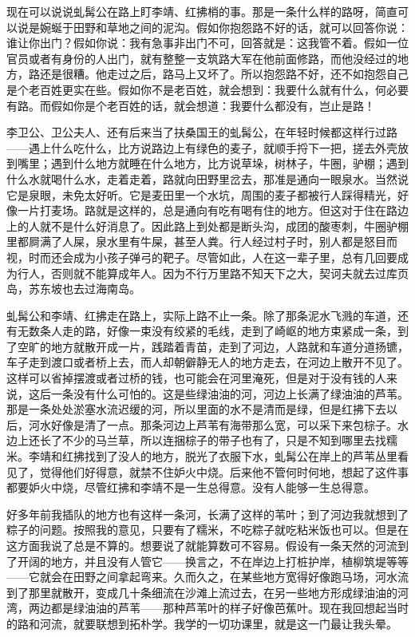 现在可以说说虬髯公在路上盯李靖、红拂梢的事。那是一条什么样的路呀，简直可以说是婉蜒于田野和草地之间的泥沟。假如你抱怨路不好的话，就可以回答你说：谁让你出门？假如你说：我有急事非出门不可，回答就是：这我管不着。假如一位官员或者有身份的人出门，就有整整一支筑路大军在他前面修路，而他没经过的地方，路还是很糟。他走过之后，路马上又坏了。所以抱怨路不好，还不如抱怨自己是个老百姓更实在些。假如你不是老百姓，就会想到：我要什么就有什么，何必要有路。而假如你是个老百姓的话，就会想道：我要什么都没有，岂止是路！ 

李卫公、卫公夫人、还有后来当了扶桑国王的虬髯公，在年轻时候都这样行过路——遇上什么吃什么，比方说路边上有绿色的麦子，就顺手捋下一把，搓去外壳放到嘴里；遇到什么地方就睡在什么地方，比方说草垛，树林子，牛圈，驴棚；遇到什么水就喝什么水，走着走着，路就向田野里岔去，那准是通向一眼泉水。当然说它是泉眼，未免太好听。它是麦田里一个水坑，周围的麦子都被行人踩得精光，好像一片打麦场。路就是这样的，总是通向有吃有喝有住的地方。但这对于住在路边上的人就不是什么好消息了。因此路上到处都是断头沟，成团的酸枣刺，牛圈驴棚里都屙满了人屎，泉水里有牛屎，甚至人粪。行人经过村子时，别人都是怒目而视，时而还会成为小孩子弹弓的靶子。尽管如此，人在这一辈子里，总有几回要成为行人，否则就不能算成年人。因为不行万里路不知天下之大，契诃夫就去过库页岛，苏东坡也去过海南岛。 

虬髯公和李靖、红拂走在路上，实际上路不止一条。除了那条泥水飞溅的车道，还有无数条人走的路，好像一束没有绞紧的毛线，走到了崎岖的地方束紧成一条，到了空旷的地方就散开成一片，践踏着青苗，走到了河边，人路就和车道分道扬镳，车子走到渡口或者桥上去，而人却朝僻静无人的地方走去，在河边上散开不见了。这样可以省掉摆渡或者过桥的钱，也可能会在河里淹死，但是对于没有钱的人来说，这后一条没有什么可怕的。这是些绿油油的河，河边上长满了绿油油的芦苇。那是一条处处淤塞水流迟缓的河，所以里面的水不是清而是绿，但是红拂下去以后，河水好像是清了一点。那条河边上芦苇有海带那么宽，可以采下来包棕子。水边上还长了不少的马兰草，所以连捆棕子的带子也有了，只是不知到哪里去找糯米。李靖和红拂找到了没人的地方，脱光了衣服下水，虬髯公在岸上的芦苇丛里看见了，觉得他们好得意，就禁不住妒火中烧。后来他不管何时何地，想起了这件事都要妒火中烧，尽管红拂和李靖不是一生总得意。没有人能够一生总得意。 

好多年前我插队的地方也有这样一条河，长满了这样的苇叶；到了河边我就想到了粽子的问题。按照我的意见，只要有了糯米，不吃粽子就吃粘米饭也可以。但是在这方面我说了总是不算的。想要说了就能算数可不容易。假设有一条天然的河流到了开阔的地方，并且没有人管它——换言之，不在岸边上打桩护岸，植柳筑堤等等——它就会在田野之间拿起弯来。久而久之，在某些地方宽得好像跑马场，河水流到了那里就散开，变成几十条细流在沙滩上流过去，在另一些地方形成绿油油的河湾，两边都是绿油油的芦苇——那种芦苇叶的样子好像芭蕉叶。现在我回想起当时的路和河流，就要联想到拓朴学。我学的一切功课里，就是这一门最让我头晕。 

